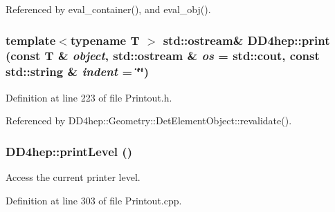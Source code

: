 Referenced by eval\_\-container(), and eval\_\-obj().\hypertarget{namespace_d_d4hep_af6eaaa572e33854eafc208b2ff8fc463}{
\subsubsection[{print}]{\setlength{\rightskip}{0pt plus 5cm}template$<$typename T $>$ std::ostream\& DD4hep::print (const {\bf T} \& {\em object}, \/  std::ostream \& {\em os} = {\ttfamily std::cout}, \/  const std::string \& {\em indent} = {\ttfamily \char`\"{}\char`\"{}})}}
\label{namespace_d_d4hep_af6eaaa572e33854eafc208b2ff8fc463}


Definition at line 223 of file Printout.h.

Referenced by DD4hep::Geometry::DetElementObject::revalidate().\hypertarget{namespace_d_d4hep_abdbd705fe59353c8596e4ad5b7355814}{
\subsubsection[{printLevel}]{ DD4hep::printLevel ()}}
\label{namespace_d_d4hep_abdbd705fe59353c8596e4ad5b7355814}


Access the current printer level. 

Definition at line 303 of file Printout.cpp.

